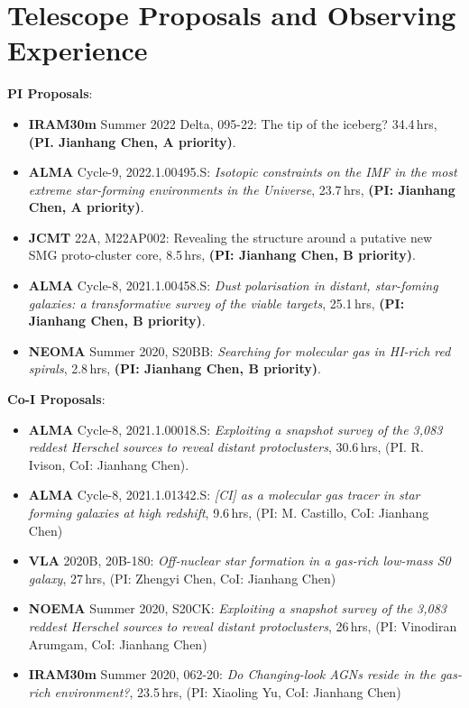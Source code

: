 \documentclass[A4,11pt]{article}
\newenvironment{paperlist}
{ \begin{itemize}[leftmargin=0.8cm, label={$\bullet$}]
    \setlength{\itemsep}{1pt}
    \setlength{\parskip}{1pt}
    \setlength{\parsep}{1pt}     }
{ \end{itemize}                  }
\begin{document}

\section{Telescope Proposals and Observing Experience}
{\bf PI Proposals}:\\
\vspace{-0.8em}
\begin{paperlist}
    \item {\bf IRAM30m} Summer 2022 Delta, 095-22:  The tip of the iceberg? 34.4\,hrs, {\bf (PI. Jianhang Chen, A priority)}.
    \item {\bf ALMA} Cycle-9, 2022.1.00495.S: \emph{Isotopic constraints on the IMF in the most extreme star-forming environments in the Universe}, 23.7\,hrs, {\bf (PI: Jianhang Chen, A priority)}. 
    \item {\bf JCMT} 22A, M22AP002: Revealing the structure around a putative new SMG proto-cluster core, 8.5\,hrs, {\bf (PI: Jianhang Chen, B priority)}.
    \item {\bf ALMA} Cycle-8, 2021.1.00458.S: \emph{Dust polarisation in distant, star-foming galaxies: a transformative survey of the viable targets}, 25.1\,hrs, {\bf (PI: Jianhang Chen, B priority)}. 
    \item {\bf NEOMA} Summer 2020, S20BB: \emph{Searching for molecular gas in HI-rich red spirals}, 2.8\,hrs, {\bf (PI: Jianhang Chen, B priority)}. 
\end{paperlist}

{\bf Co-I Proposals}:\\
\vspace{-0.8em}
\begin{paperlist}
    \item {\bf ALMA} Cycle-8, 2021.1.00018.S: \emph{Exploiting a snapshot survey of the 3,083 reddest Herschel sources to reveal distant protoclusters}, 30.6\,hrs, (PI. R. Ivison, CoI: Jianhang Chen).
    \item {\bf ALMA} Cycle-8, 2021.1.01342.S: \emph{[CI] as a molecular gas tracer in star forming galaxies at high redshift}, 9.6\,hrs, (PI: M. Castillo, CoI: Jianhang Chen)
    \item {\bf VLA} 2020B, 20B-180: \emph{Off-nuclear star formation in a gas-rich low-mass S0 galaxy}, 27\,hrs, (PI: Zhengyi Chen, CoI: Jianhang Chen)
    \item {\bf NOEMA} Summer 2020, S20CK: \emph{Exploiting a snapshot survey of the 3,083 reddest Herschel sources to reveal distant protoclusters}, 26\,hrs, (PI: Vinodiran Arumgam, CoI: Jianhang Chen)
    \item {\bf IRAM30m} Summer 2020, 062-20: \emph{Do Changing-look AGNs reside in the gas-rich environment?}, 23.5\,hrs, (PI: Xiaoling Yu, CoI: Jianhang Chen)
\end{paperlist}
\end{document}
